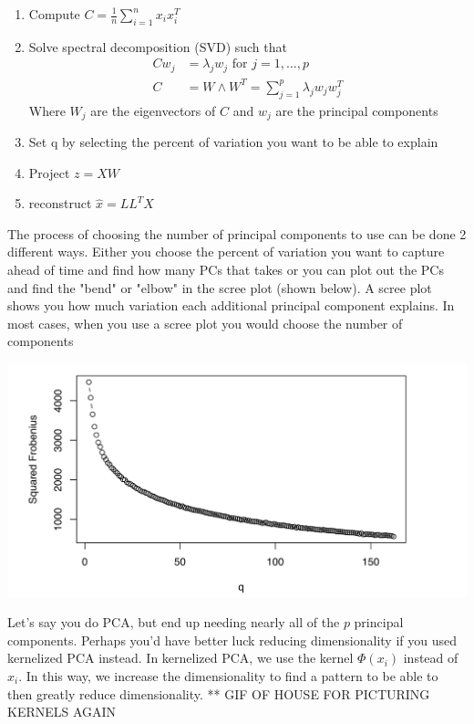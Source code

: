 \documentclass[a4paper]{article}
\begin{document}
\begin{enumerate}
\item Compute $C=\frac{1}{n}\sum_{i=1}^{n}x_{i}x_{i}^{T}$
\item Solve spectral decomposition (SVD) such that \begin{align*}
Cw_{j} &= \lambda_{j}w_{j} \text{ for } j=1,\dots,p\\
C&= W\wedge W^{T}=\sum_{j=1}^{p}\lambda_{j}w_{j}w_{j}^{T}
\end{align*}
Where $W_{j}$ are the eigenvectors of $C$ and $w_{j}$ are the principal components
\item Set q by selecting the percent of variation you want to be able to explain
\item Project $z=XW$
\item reconstruct $\hat{x}=LL^{T}X$
\end{enumerate}

The process of choosing the number of principal components to use can be done 2 different ways. Either you choose the percent of variation you want to capture ahead of time and find how many PCs that takes or you can plot out the PCs and find the "bend" or "elbow" in the scree plot (shown below). A scree plot shows you how much variation each additional principal component explains. In most cases, when you use a scree plot you would choose the number of components 

\includegraphics[scale=.6]{scree.png}

Let's say you do PCA, but end up needing nearly all of the $p$ principal components. Perhaps you'd have better luck reducing dimensionality if you used kernelized PCA instead. In kernelized PCA, we use the kernel $\Phi(x_{i})$ instead of $x_{i}$. In this way, we increase the dimensionality to find a pattern to be able to then greatly reduce dimensionality.
** GIF OF HOUSE FOR PICTURING KERNELS AGAIN
\end{document}
